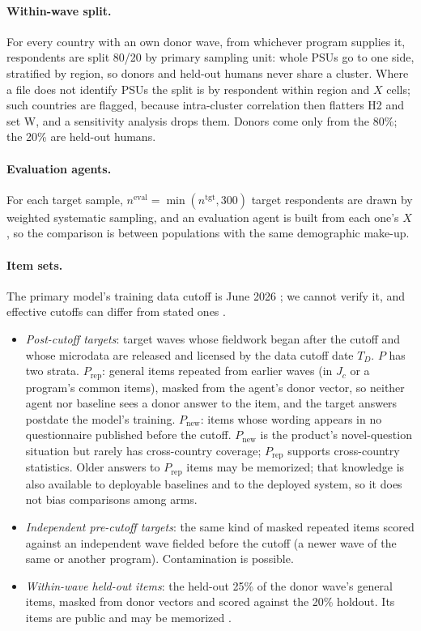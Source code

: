 \documentclass[10pt]{article}
\begin{document}
\paragraph{Within-wave split.} For every country with an own donor wave, from whichever program supplies it, respondents are split 80/20 by primary sampling unit: whole PSUs go to one side, stratified by region, so donors and held-out humans never share a cluster. Where a file does not identify PSUs the split is by respondent within region and $X$ cells; such countries are flagged, because intra-cluster correlation then flatters H2 and set W, and a sensitivity analysis drops them. Donors come only from the 80\%; the 20\% are held-out humans.

\paragraph{Evaluation agents.} For each target sample, $n^{\text{eval}} = \min(n^{\text{tgt}}, 300)$ target respondents are drawn by weighted systematic sampling, and an evaluation agent is built from each one's $X$, so the comparison is between populations with the same demographic make-up.

\paragraph{Item sets.} The primary model's training data cutoff is June 2026 \citep{claudemodels}; we cannot verify it, and effective cutoffs can differ from stated ones \citep{cheng2024dated}.
\begin{itemize}
  \item[(P)] \emph{Post-cutoff targets}: target waves whose fieldwork began after the cutoff and whose microdata are released and licensed by the data cutoff date $T_D$. $P$ has two strata. \emph{$P_{\text{rep}}$}: general items repeated from earlier waves (in $J_c$ or a program's common items), masked from the agent's donor vector, so neither agent nor baseline sees a donor answer to the item, and the target answers postdate the model's training. \emph{$P_{\text{new}}$}: items whose wording appears in no questionnaire published before the cutoff. $P_{\text{new}}$ is the product's novel-question situation but rarely has cross-country coverage; $P_{\text{rep}}$ supports cross-country statistics. Older answers to $P_{\text{rep}}$ items may be memorized; that knowledge is also available to deployable baselines and to the deployed system, so it does not bias comparisons among arms.
  \item[(I)] \emph{Independent pre-cutoff targets}: the same kind of masked repeated items scored against an independent wave fielded before the cutoff (a newer wave of the same or another program). Contamination is possible.
  \item[(W)] \emph{Within-wave held-out items}: the held-out 25\% of the donor wave's general items, masked from donor vectors and scored against the 20\% holdout. Its items are public and may be memorized \citep{durmus2023,zhao2024wvb}.
\end{itemize}
\end{document}
